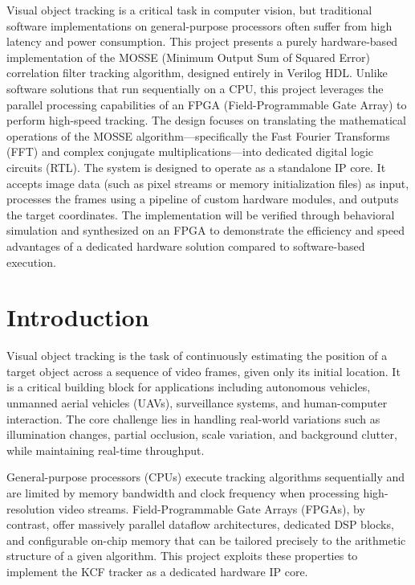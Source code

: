 \documentclass[a4paper,12pt]{report}
\begin{document}
\vspace{0.5cm}

Visual object tracking is a critical task in computer vision, but traditional software implementations on general-purpose processors often suffer from high latency and power consumption. This project presents a purely hardware-based implementation of the MOSSE (Minimum Output Sum of Squared Error) correlation filter tracking algorithm, designed entirely in Verilog HDL. Unlike software solutions that run sequentially on a CPU, this project leverages the parallel processing capabilities of an FPGA (Field-Programmable Gate Array) to perform high-speed tracking. The design focuses on translating the mathematical operations of the MOSSE algorithm---specifically the Fast Fourier Transforms (FFT) and complex conjugate multiplications---into dedicated digital logic circuits (RTL). The system is designed to operate as a standalone IP core. It accepts image data (such as pixel streams or memory initialization files) as input, processes the frames using a pipeline of custom hardware modules, and outputs the target coordinates. The implementation will be verified through behavioral simulation and synthesized on an FPGA to demonstrate the efficiency and speed advantages of a dedicated hardware solution compared to software-based execution.

\pagebreak
\tableofcontents
\pagebreak
\listoffigures
\pagebreak
\listoftables
\pagebreak

\chapter{Introduction}

Visual object tracking is the task of continuously estimating the position of a target object across a sequence of video frames, given only its initial location. It is a critical building block for applications including autonomous vehicles, unmanned aerial vehicles (UAVs), surveillance systems, and human-computer interaction. The core challenge lies in handling real-world variations such as illumination changes, partial occlusion, scale variation, and background clutter, while maintaining real-time throughput.

\par General-purpose processors (CPUs) execute tracking algorithms sequentially and are limited by memory bandwidth and clock frequency when processing high-resolution video streams. Field-Programmable Gate Arrays (FPGAs), by contrast, offer massively parallel dataflow architectures, dedicated DSP blocks, and configurable on-chip memory that can be tailored precisely to the arithmetic structure of a given algorithm. This project exploits these properties to implement the KCF tracker as a dedicated hardware IP core.
\end{document}
